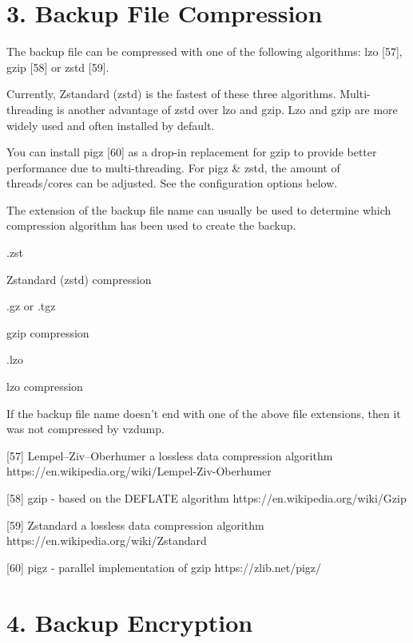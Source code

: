\section{3. Backup File Compression}

The backup file can be compressed with one of the following algorithms: lzo [57], gzip [58] or zstd [59].

Currently, Zstandard (zstd) is the fastest of these three algorithms. Multi-threading is another advantage of zstd over lzo and gzip. Lzo and gzip are more widely used and often installed by default.

You can install pigz [60] as a drop-in replacement for gzip to provide better performance due to multi-threading. For pigz & zstd, the amount of threads/cores can be adjusted. See the configuration options below.

The extension of the backup file name can usually be used to determine which compression algorithm has been used to create the backup.

.zst

Zstandard (zstd) compression

.gz or .tgz

gzip compression

.lzo

lzo compression

If the backup file name doesn’t end with one of the above file extensions, then it was not compressed by vzdump.

[57] Lempel–Ziv–Oberhumer a lossless data compression algorithm https://en.wikipedia.org/wiki/Lempel-Ziv-Oberhumer

[58] gzip - based on the DEFLATE algorithm https://en.wikipedia.org/wiki/Gzip

[59] Zstandard a lossless data compression algorithm https://en.wikipedia.org/wiki/Zstandard

[60] pigz - parallel implementation of gzip https://zlib.net/pigz/

\begin{table}[htbp]

\centering

\begin{tabular}

\end{tabular}

\end{table}


\section{4. Backup Encryption}

